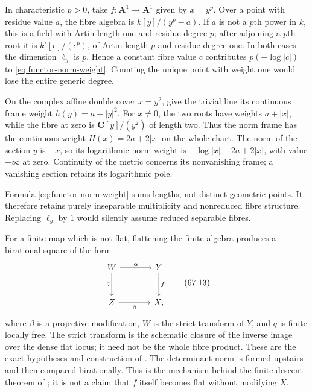 \begin{example}
\label{ex:functor-radicial-norm}
In characteristic $p>0$, take $f:\mathbf A^1\to\mathbf A^1$ given by
$x=y^p$. Over a point with residue value $a$, the fibre algebra is
$k[y]/(y^p-a)$. If $a$ is not a $p$th power in $k$, this is a field with Artin
length one and residue degree $p$; after adjoining a $p$th root it is
$k'[\epsilon]/(\epsilon^p)$, of Artin length $p$ and residue degree one.
In both cases the dimension $\ell_y$ is $p$. Hence a
constant fibre value $c$ contributes $p(-\log|c|)$ to
\eqref{eq:functor-norm-weight}. Counting the unique point with weight one
would lose the entire generic degree.
\end{example}

\begin{example}
\label{ex:functor-coalescing-norm}
On the complex affine double cover $x=y^2$, give the trivial line its
continuous frame weight $h(y)=a+|y|^2$. For $x\neq0$, the two roots have
weights $a+|x|$, while the fibre at zero is
$\mathbf C[y]/(y^2)$ of length two. Thus the norm frame has the continuous
weight $H(x)=2a+2|x|$ on the whole chart. The norm of the section $y$ is
$-x$, so its logarithmic norm weight is $-\log|x|+2a+2|x|$, with value
$+\infty$ at zero. Continuity of the metric concerns its nonvanishing
frame; a vanishing section retains its logarithmic pole.
\end{example}

\begin{remark}
\label{rem:functor-inseparable}
Formula \eqref{eq:functor-norm-weight} sums lengths, not distinct
geometric points. It therefore retains purely inseparable
multiplicity and nonreduced fibre structure. Replacing $\ell_y$ by
$1$ would silently assume reduced separable fibres.
\end{remark}

For a finite map which is not flat, flattening the finite algebra
produces a birational square of the form
\[
\begin{tikzcd}[column sep=large,row sep=large]
W \arrow[r,"\alpha"] \arrow[d,"q"']&
Y \arrow[d,"f"]\\
Z \arrow[r,"\beta"']&
X ,
\end{tikzcd}
\tag{67.13}\label{eq:functor-finite-flat-square}
\]
where $\beta$ is a projective modification, $W$ is the strict
transform of $Y$, and $q$ is finite locally free. The strict transform is
the schematic closure of the inverse image over the dense flat locus;
it need not be the whole fibre product. These are the exact hypotheses
and construction of . The determinant norm is formed
upstairs and then compared birationally. This is the mechanism behind
the finite descent theorem of
; it is not a claim that $f$
itself becomes flat without modifying $X$.

